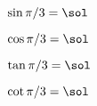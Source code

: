 \SIN{\numberTHIRDPI}{\sol}
$\sin \pi/3=\sol$

\COS{\numberTHIRDPI}{\sol}
$\cos \pi/3=\sol$

\TAN{\numberTHIRDPI}{\sol}
$\tan \pi/3=\sol$

\COT{\numberTHIRDPI}{\sol}
$\cot \pi/3=\sol$
